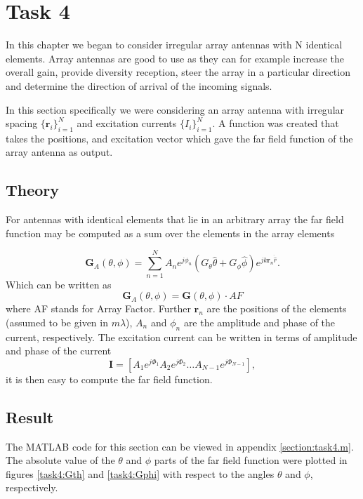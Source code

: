 \chapter{Task 4}
\label{chapter:task4}
In this chapter we began to consider irregular array antennas with N identical elements. Array antennas are good to use as they can for example increase the overall gain, provide diversity reception, steer the array in a particular direction and determine the direction of arrival of the incoming signals.\cite{AntennasFundamentals} 

In this section specifically we were considering an array antenna with irregular spacing $\{\mathbf{r}_i\}_{i=1}^N$ and excitation currents $\{I_i\}_{i=1}^N$. A function was created that takes the positions,  and  excitation vector which gave the far field function of the array antenna as output.
 
\section{Theory}
For antennas with identical elements that lie in an arbitrary array the far field function  may be computed as a sum over the elements in the array elements

\begin{equation}
\mathbf{G}_A(\theta, \phi) = \sum_{n=1}^N A_ne^{j\phi_n}(G_{\theta}\hat{\theta} + G_{\phi}\hat{\phi}) e^{jk\mathbf{r}_n\dot{\hat{r}}}.
\end{equation}
Which can be written as 
\begin{equation}
\mathbf{G}_A(\theta, \phi) = \mathbf{G}(\theta, \phi) \cdot AF
\end{equation}
where AF stands for Array Factor. Further $\mathbf{r}_n$ are the positions of the elements (assumed to be given in $m\lambda$), $A_n$ and $\phi_n$ are the amplitude and phase of the current, respectively. The excitation current can be written in terms of amplitude and phase of the current 
\begin{equation}
\mathbf{I} =[A_1e^{j\Phi_1} A_2e^{j\Phi_2} \dots A_{N-1}e^{j\Phi_{N-1}}],
\end{equation}
it is then easy to compute the far field function. \cite{kildal2000foundations} 

\section{Result}
The MATLAB code for this section can be  viewed in appendix \ref{section:task4.m}. The absolute value of the $\theta$ and $\phi$ parts of the  far field function  were plotted in figures \ref{task4:Gth} and \ref{task4:Gphi} with respect to the angles  $\theta$ and $\phi$, respectively. 

